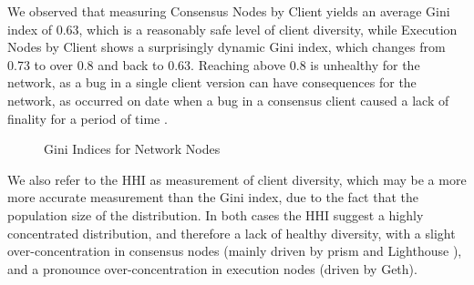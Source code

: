 \documentclass[conference]{IEEEtran}
\begin{document}
We observed that measuring Consensus Nodes by Client yields an average Gini index of 0.63, which is a reasonably safe level of client diversity, while Execution Nodes by Client shows a surprisingly dynamic Gini index, which changes from 0.73 to over 0.8 and back to 0.63.  Reaching above 0.8 is unhealthy for the network, as a bug in a single client version can have consequences for the network, as occurred on date when a bug in a consensus client caused a lack of finality for a period of time \cite{offchainlabs2023}.

\begin{figure}[ht]
\begin{center}
\end{center}
\caption{Gini Indices for Network Nodes}
\label{fig:gini index network nodes}
\end{figure}

We also refer to the HHI as measurement of client diversity, which may be a more more accurate measurement than the Gini index, due to the fact that  the population size of the distribution.  In both cases the HHI suggest a highly concentrated distribution, and therefore a lack of healthy diversity, with a slight over-concentration in consensus nodes (mainly driven by prism and Lighthouse \cite{abu2023}), and a pronounce over-concentration in execution nodes (driven by Geth).
\end{document}
